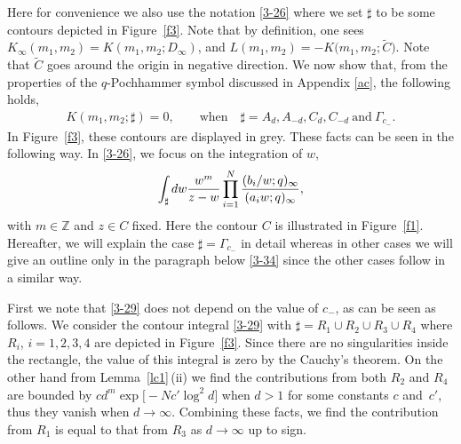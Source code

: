 \documentclass[11pt]{article}
\numberwithin{equation}{section}
\numberwithin{equation}{section}
\def\i{\infty}
\def\Z{\mathbb{Z}}
\begin{document}
 Here for convenience we also use
 the notation \eqref{3-26} where
 we set $\sharp$ to be some contours
 depicted in
 Figure~\ref{f3}. Note that by definition, one sees
 $K_{\infty}(m_1,m_2)= K(m_1,m_2;D_{\i})$,
 and ${L(m_1,m_2)=-K\big(m_1,m_2;\tilde{C}\big)}$.
 Note that $\tilde{C}$ goes around the origin in negative direction.
 We now show that,
 from the properties of the $q$-Pochhammer symbol discussed in
 Appendix \ref{ac}, the following holds,
\begin{align}
\label{s34-2}
 K(m_1,m_2;\sharp)=0,
 \qquad \text{when}\quad \sharp=A_d,A_{-d},C_d,C_{-d}\ \text{and}\ \Gamma_{c_-}.
\end{align}
 In Figure~\ref{f3}, these contours
 are displayed in grey.
 These facts can be
 seen in the following way.
 In \eqref{3-26}, we focus on the
 integration of $w$,
 \begin{align}
 \label{3-29}
 \int_{\sharp}{\rm d}w\frac{w^{m}}{z-w}
 \prod_{i=1}^N
 \frac{{(b_i/w;q)_{\i}}}{(a_iw;q)_{\i}},
 \end{align}
 with $m\in\Z$ and $z\in C$ fixed. Here the contour $C$ is illustrated in Figure~\ref{f1}.
 Hereafter, we will explain the case $\sharp=\Gamma_{c_-}$ in detail whereas in other cases we will give an outline only in the paragraph below \eqref{3-34} since
 the other cases follow in a similar
 way.

 First we note that \eqref{3-29} does not depend on the value of $c_-$, as can be seen as follows. We consider the contour integral \eqref{3-29}
 with $\sharp=R_1\cup R_2\cup R_3\cup R_4$ where $R_i$, $i=1,2,3,4$ are depicted in
 Figure~\ref{f3}. Since there are no singularities inside the rectangle, the value of this integral is zero by the Cauchy's theorem. On the other hand
 from Lemma~\ref{lc1}\,(ii) we find the contributions from both $R_2$ and $R_4$ are bounded by $cd^m \exp\bigl[-Nc'\log^2 d\bigr]$ when $d>1$ for some constants $c$ and~$c'$, thus they vanish when $d\rightarrow\i$. Combining these facts, we find
 the contribution from $R_1$ is equal to that from $R_3$
 as $d\rightarrow\i$ up to sign.
\end{document}

